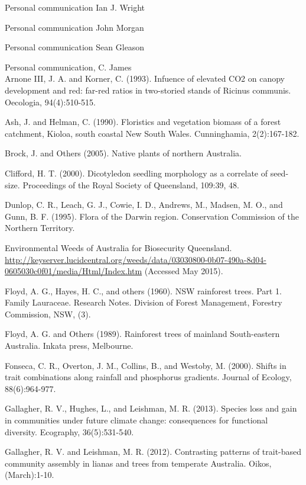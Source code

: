 \documentclass[openright,12pt,a4paper]{memoir}
\begin{document}


Personal communication Ian J. Wright

Personal communication John Morgan

Personal communication Sean Gleason

Personal communication, C. James \\


Arnone III, J. A. and Korner, C. (1993). Infuence of elevated CO2 on canopy development and red: far-red ratios in two-storied stands of Ricinus communis. Oecologia, 94(4):510-515.

Ash, J. and Helman, C. (1990). Floristics and vegetation biomass of a forest catchment, Kioloa, south coastal New South Wales. Cunninghamia, 2(2):167-182.

Brock, J. and Others (2005). Native plants of northern Australia.

Clifford, H. T. (2000). Dicotyledon seedling morphology as a correlate of seed-size. Proceedings of the Royal Society of Queensland, 109:39, 48.

Dunlop, C. R., Leach, G. J., Cowie, I. D., Andrews, M., Madsen, M. O., and Gunn, B. F. (1995). Flora of the Darwin region. Conservation Commission of the Northern Territory.

Environmental Weeds of Australia for Biosecurity Queensland. \url{http://keyserver.lucidcentral.org/weeds/data/03030800-0b07-490a-8d04-0605030c0f01/media/Html/Index.htm} (Accessed May 2015).

Floyd, A. G., Hayes, H. C., and others (1960). NSW rainforest trees. Part 1. Family Lauraceae. Research Notes. Division of Forest Management, Forestry Commission, NSW, (3).

Floyd, A. G. and Others (1989). Rainforest trees of mainland South-eastern Australia. Inkata press, Melbourne.

Fonseca, C. R., Overton, J. M., Collins, B., and Westoby, M. (2000). Shifts in trait combinations along rainfall and phosphorus gradients. Journal of Ecology, 88(6):964-977.

Gallagher, R. V., Hughes, L., and Leishman, M. R. (2013). Species loss and gain in communities under future climate change: consequences for functional diversity. Ecography, 36(5):531-540.

Gallagher, R. V. and Leishman, M. R. (2012). Contrasting patterns of trait-based community assembly in lianas and trees from temperate Australia. Oikos, (March):1-10.
\end{document}
